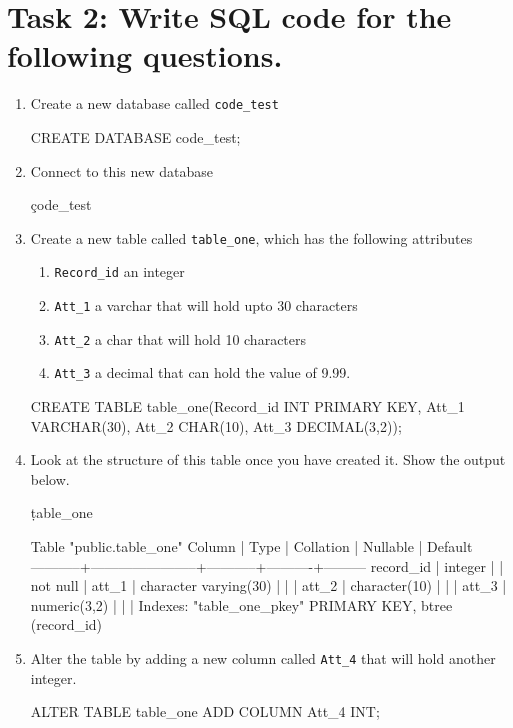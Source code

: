 \section*{Task 2: Write SQL code for the following questions.}
\begin{enumerate}
\item Create a new database called \verb|code_test|
\begin{sql}
CREATE DATABASE code_test;
\end{sql}
\item Connect to this new database
\begin{sql}
\c code_test
\end{sql}
\item Create a new table called \verb|table_one|, which has the following attributes
\begin{enumerate}
    \item \verb|Record_id| an integer
    \item \verb|Att_1| a varchar that will hold upto 30 characters
    \item \verb|Att_2| a char that will hold 10 characters
    \item \verb|Att_3| a decimal that can hold the value of 9.99.
\end{enumerate}
\begin{sql}
CREATE TABLE table_one(Record_id INT PRIMARY KEY, Att_1 VARCHAR(30), Att_2 CHAR(10), Att_3 DECIMAL(3,2));
\end{sql}
\item Look at the structure of this table once you have created it. Show the output below.
\begin{sql}
\d table_one
\end{sql}
\begin{pseudo*}
                      Table "public.table_one"
  Column   |         Type          | Collation | Nullable | Default
-----------+-----------------------+-----------+----------+---------
 record_id | integer               |           | not null |
 att_1     | character varying(30) |           |          |
 att_2     | character(10)         |           |          |
 att_3     | numeric(3,2)          |           |          |
Indexes:
    "table_one_pkey" PRIMARY KEY, btree (record_id)
\end{pseudo*}
\item Alter the table by adding a new column called \verb|Att_4| that will hold another integer.
\begin{sql}
ALTER TABLE table_one ADD COLUMN Att_4 INT;

\end{sql}
\end{enumerate}
